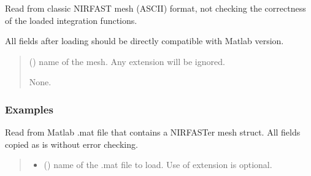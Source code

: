\documentclass[letterpaper,10pt,english]{sphinxmanual}
\begin{document}
\begin{fulllineitems}
\begin{fulllineitems}
\label{\detokenize{_autosummary/nirfasterff.base.stnd_mesh.stndmesh:nirfasterff.base.stnd_mesh.stndmesh.from_file}}
\pysigstartsignatures
{}
\pysigstopsignatures
\sphinxAtStartPar
Read from classic NIRFAST mesh (ASCII) format, not checking the correctness of the loaded integration functions.

\sphinxAtStartPar
All fields after loading should be directly compatible with Matlab version.
\begin{quote}\begin{description}
\sphinxAtStartPar
{} () \textendash{} name of the mesh. Any extension will be ignored.

\sphinxAtStartPar
None.

\end{description}\end{quote}
\subsubsection*{Examples}

\begin{sphinxVerbatim}[commandchars=\\\{\}]
  
\end{sphinxVerbatim}

\end{fulllineitems}


\begin{fulllineitems}
\label{\detokenize{_autosummary/nirfasterff.base.stnd_mesh.stndmesh:nirfasterff.base.stnd_mesh.stndmesh.from_mat}}
\pysigstartsignatures
{}
\pysigstopsignatures
\sphinxAtStartPar
Read from Matlab .mat file that contains a NIRFASTer mesh struct. All fields copied as is without error checking.
\begin{quote}\begin{description}
\begin{itemize}
\item {} 
\sphinxAtStartPar
{} () \textendash{} name of the .mat file to load. Use of extension is optional.


\end{itemize}
\end{description}
\end{quote}
\end{fulllineitems}
\end{fulllineitems}
\end{document}
